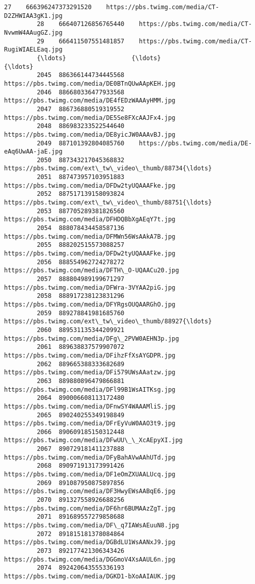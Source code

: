 \documentclass[11pt]{article}
\begin{document}
\begin{Verbatim}[commandchars=\\\{\}]
         27    666396247373291520    https://pbs.twimg.com/media/CT-D2ZHWIAA3gK1.jpg   
         28    666407126856765440    https://pbs.twimg.com/media/CT-NvwmW4AAugGZ.jpg   
         29    666411507551481857    https://pbs.twimg.com/media/CT-RugiWIAELEaq.jpg   
         {\ldots}                  {\ldots}                                                {\ldots}   
         2045  886366144734445568    https://pbs.twimg.com/media/DE0BTnQUwAApKEH.jpg   
         2046  886680336477933568    https://pbs.twimg.com/media/DE4fEDzWAAAyHMM.jpg   
         2047  886736880519319552    https://pbs.twimg.com/media/DE5Se8FXcAAJFx4.jpg   
         2048  886983233522544640    https://pbs.twimg.com/media/DE8yicJW0AAAvBJ.jpg   
         2049  887101392804085760    https://pbs.twimg.com/media/DE-eAq6UwAA-jaE.jpg   
         2050  887343217045368832  https://pbs.twimg.com/ext\_tw\_video\_thumb/88734{\ldots}   
         2051  887473957103951883    https://pbs.twimg.com/media/DFDw2tyUQAAAFke.jpg   
         2052  887517139158093824  https://pbs.twimg.com/ext\_tw\_video\_thumb/88751{\ldots}   
         2053  887705289381826560    https://pbs.twimg.com/media/DFHDQBbXgAEqY7t.jpg   
         2054  888078434458587136    https://pbs.twimg.com/media/DFMWn56WsAAkA7B.jpg   
         2055  888202515573088257    https://pbs.twimg.com/media/DFDw2tyUQAAAFke.jpg   
         2056  888554962724278272    https://pbs.twimg.com/media/DFTH\_O-UQAACu20.jpg   
         2057  888804989199671297    https://pbs.twimg.com/media/DFWra-3VYAA2piG.jpg   
         2058  888917238123831296    https://pbs.twimg.com/media/DFYRgsOUQAARGhO.jpg   
         2059  889278841981685760  https://pbs.twimg.com/ext\_tw\_video\_thumb/88927{\ldots}   
         2060  889531135344209921    https://pbs.twimg.com/media/DFg\_2PVW0AEHN3p.jpg   
         2061  889638837579907072    https://pbs.twimg.com/media/DFihzFfXsAYGDPR.jpg   
         2062  889665388333682689    https://pbs.twimg.com/media/DFi579UWsAAatzw.jpg   
         2063  889880896479866881    https://pbs.twimg.com/media/DFl99B1WsAITKsg.jpg   
         2064  890006608113172480    https://pbs.twimg.com/media/DFnwSY4WAAAMliS.jpg   
         2065  890240255349198849    https://pbs.twimg.com/media/DFrEyVuW0AAO3t9.jpg   
         2066  890609185150312448    https://pbs.twimg.com/media/DFwUU\_\_XcAEpyXI.jpg   
         2067  890729181411237888    https://pbs.twimg.com/media/DFyBahAVwAAhUTd.jpg   
         2068  890971913173991426    https://pbs.twimg.com/media/DF1eOmZXUAALUcq.jpg   
         2069  891087950875897856    https://pbs.twimg.com/media/DF3HwyEWsAABqE6.jpg   
         2070  891327558926688256    https://pbs.twimg.com/media/DF6hr6BUMAAzZgT.jpg   
         2071  891689557279858688    https://pbs.twimg.com/media/DF\_q7IAWsAEuuN8.jpg   
         2072  891815181378084864    https://pbs.twimg.com/media/DGBdLU1WsAANxJ9.jpg   
         2073  892177421306343426    https://pbs.twimg.com/media/DGGmoV4XsAAUL6n.jpg   
         2074  892420643555336193    https://pbs.twimg.com/media/DGKD1-bXoAAIAUK.jpg   
         

\end{Verbatim}
\end{document}
